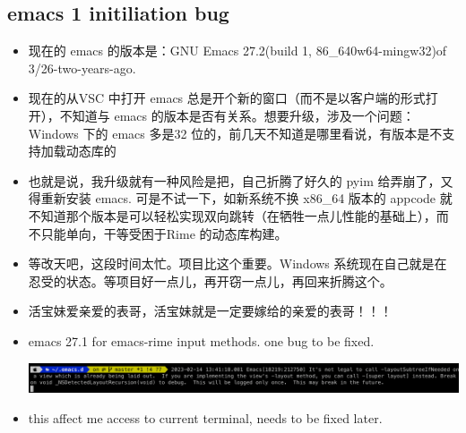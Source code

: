 \documentclass[9pt, b5paper]{article}
\begin{document}
\subsection{{\bfseries\sffamily emacs} 1 initiliation bug}
\label{sec:orgcfc54f7}
\begin{itemize}
\item 现在的 emacs 的版本是：GNU Emacs 27.2(build 1, 86\_640w64-mingw32)of 3/26-two-years-ago.
\item 现在的从VSC 中打开 emacs 总是开个新的窗口（而不是以客户端的形式打开），不知道与 emacs 的版本是否有关系。想要升级，涉及一个问题：Windows 下的 emacs 多是32 位的，前几天不知道是哪里看说，有版本是不支持加载动态库的
\item 也就是说，我升级就有一种风险是把，自己折腾了好久的 pyim 给弄崩了，又得重新安装 emacs. 可是不试一下，如新系统不换 x86\_64 版本的 appcode 就不知道那个版本是可以轻松实现双向跳转（在牺牲一点儿性能的基础上），而不只能单向，干等受困于Rime 的动态库构建。
\item 等改天吧，这段时间太忙。项目比这个重要。Windows 系统现在自己就是在忍受的状态。等项目好一点儿，再开窃一点儿，再回来折腾这个。
\item 活宝妹爱亲爱的表哥，活宝妹就是一定要嫁给的亲爱的表哥！！！
\item emacs 27.1 for emacs-rime input methods. one bug to be fixed. 

\begin{center}
\includegraphics[width=.9\linewidth]{./pic/readme_20230214_134351.png}
\end{center}
\item this affect me access to current terminal, needs to be fixed later.
\end{itemize}
\end{document}
